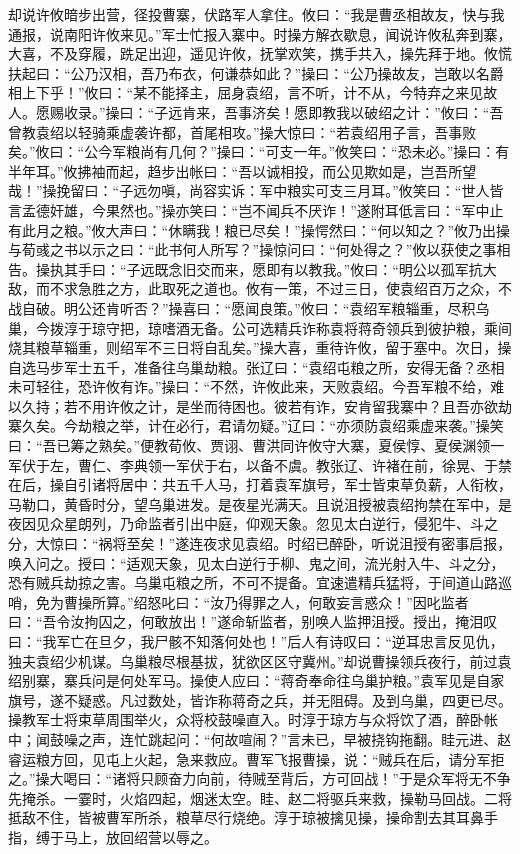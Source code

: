 却说许攸暗步出营，径投曹寨，伏路军人拿住。攸曰：“我是曹丞相故友，快与我通报，说南阳许攸来见。”军士忙报入寨中。时操方解衣歇息，闻说许攸私奔到寨，大喜，不及穿履，跣足出迎，遥见许攸，抚掌欢笑，携手共入，操先拜于地。攸慌扶起曰：“公乃汉相，吾乃布衣，何谦恭如此？”操曰：“公乃操故友，岂敢以名爵相上下乎！”攸曰：“某不能择主，屈身袁绍，言不听，计不从，今特弃之来见故人。愿赐收录。”操曰：“子远肯来，吾事济矣！愿即教我以破绍之计：”攸曰：“吾曾教袁绍以轻骑乘虚袭许都，首尾相攻。”操大惊曰：“若袁绍用子言，吾事败矣。”攸曰：“公今军粮尚有几何？”操曰：“可支一年。”攸笑曰：“恐未必。”操曰：有半年耳。”攸拂袖而起，趋步出帐曰：“吾以诚相投，而公见欺如是，岂吾所望哉！”操挽留曰：“子远勿嗔，尚容实诉：军中粮实可支三月耳。”攸笑曰：“世人皆言孟德奸雄，今果然也。”操亦笑曰：“岂不闻兵不厌诈！”遂附耳低言曰：“军中止有此月之粮。”攸大声曰：“休瞒我！粮已尽矣！”操愕然曰：“何以知之？”攸乃出操与荀彧之书以示之曰：“此书何人所写？”操惊问曰：“何处得之？”攸以获使之事相告。操执其手曰：“子远既念旧交而来，愿即有以教我。”攸曰：“明公以孤军抗大敌，而不求急胜之方，此取死之道也。攸有一策，不过三日，使袁绍百万之众，不战自破。明公还肯听否？”操喜曰：“愿闻良策。”攸曰：“袁绍军粮辎重，尽积乌巢，今拨淳于琼守把，琼嗜酒无备。公可选精兵诈称袁将蒋奇领兵到彼护粮，乘间烧其粮草辎重，则绍军不三日将自乱矣。”操大喜，重待许攸，留于塞中。次日，操自选马步军士五千，准备往乌巢劫粮。张辽曰：“袁绍屯粮之所，安得无备？丞相未可轻往，恐许攸有诈。”操曰：“不然，许攸此来，天败袁绍。今吾军粮不给，难以久持；若不用许攸之计，是坐而待困也。彼若有诈，安肯留我寨中？且吾亦欲劫寨久矣。今劫粮之举，计在必行，君请勿疑。”辽曰：“亦须防袁绍乘虚来袭。”操笑曰：“吾已筹之熟矣。”便教荀攸、贾诩、曹洪同许攸守大寨，夏侯惇、夏侯渊领一军伏于左，曹仁、李典领一军伏于右，以备不虞。教张辽、许褚在前，徐晃、于禁在后，操自引诸将居中：共五千人马，打着袁军旗号，军士皆束草负薪，人衔枚，马勒口，黄昏时分，望乌巢进发。是夜星光满天。且说沮授被袁绍拘禁在军中，是夜因见众星朗列，乃命监者引出中庭，仰观天象。忽见太白逆行，侵犯牛、斗之分，大惊曰：“祸将至矣！”遂连夜求见袁绍。时绍已醉卧，听说沮授有密事启报，唤入问之。授曰：“适观天象，见太白逆行于柳、鬼之间，流光射入牛、斗之分，恐有贼兵劫掠之害。乌巢屯粮之所，不可不提备。宜速遣精兵猛将，于间道山路巡哨，免为曹操所算。”绍怒叱曰：“汝乃得罪之人，何敢妄言惑众！”因叱监者曰：“吾令汝拘囚之，何敢放出！”遂命斩监者，别唤人监押沮授。授出，掩泪叹曰：“我军亡在旦夕，我尸骸不知落何处也！”后人有诗叹曰：“逆耳忠言反见仇，独夫袁绍少机谋。乌巢粮尽根基拔，犹欲区区守冀州。”却说曹操领兵夜行，前过袁绍别寨，寨兵问是何处军马。操使人应曰：“蒋奇奉命往乌巢护粮。”袁军见是自家旗号，遂不疑惑。凡过数处，皆诈称蒋奇之兵，并无阻碍。及到乌巢，四更已尽。操教军士将束草周围举火，众将校鼓噪直入。时淳于琼方与众将饮了酒，醉卧帐中；闻鼓噪之声，连忙跳起问：“何故喧闹？”言未已，早被挠钩拖翻。眭元进、赵睿运粮方回，见屯上火起，急来救应。曹军飞报曹操，说：“贼兵在后，请分军拒之。”操大喝曰：“诸将只顾奋力向前，待贼至背后，方可回战！”于是众军将无不争先掩杀。一霎时，火焰四起，烟迷太空。眭、赵二将驱兵来救，操勒马回战。二将抵敌不住，皆被曹军所杀，粮草尽行烧绝。淳于琼被擒见操，操命割去其耳鼻手指，缚于马上，放回绍营以辱之。

